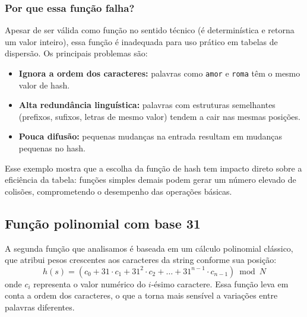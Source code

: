 \subsubsection*{Por que essa função falha?}

Apesar de ser válida como função no sentido técnico (é determinística e retorna um valor inteiro), essa função é inadequada para uso prático em tabelas de dispersão. 
Os principais problemas são:

\begin{itemize}
  \item \textbf{Ignora a ordem dos caracteres:} palavras como \texttt{amor} e \texttt{roma} têm o mesmo valor de hash.
  \item \textbf{Alta redundância linguística:} palavras com estruturas semelhantes (prefixos, sufixos, letras de mesmo valor) tendem a cair nas mesmas posições.
  \item \textbf{Pouca difusão:} pequenas mudanças na entrada resultam em mudanças pequenas no hash.
\end{itemize}

Esse exemplo mostra que a escolha da função de hash tem impacto direto sobre a eficiência da tabela: funções simples demais podem gerar um número elevado de colisões, comprometendo o desempenho das operações básicas.

\subsection*{Função polinomial com base 31}

A segunda função que analisamos é baseada em um cálculo polinomial clássico, que atribui pesos crescentes aos caracteres da string conforme sua posição:
\[
h(s) = (c_0 + 31 \cdot c_1 + 31^2 \cdot c_2 + \dots + 31^{n-1} \cdot c_{n-1}) \bmod N
\]
onde $c_i$ representa o valor numérico do $i$-ésimo caractere. Essa função leva em conta a ordem dos caracteres, o que a torna mais sensível a variações entre palavras diferentes.

